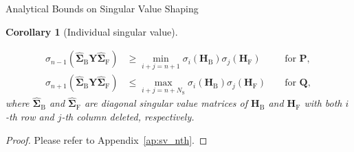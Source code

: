 \documentclass[journal]{IEEEtran}
\newtheorem{corollary}{Corollary}[proposition]
\begin{document}
\begin{section}{Analytical Bounds on Singular Value Shaping}
\begin{corollary}[Individual singular value\label{co:sv_nth}]
\begin{itemize}
				\begin{subequations}
					\begin{alignat}{2}
						\sigma_{n{-}1}(\hat{\mathbf{\Sigma}}_{\mathrm{B}} \mathbf{Y} \hat{\mathbf{\Sigma}}_{\mathrm{F}}) & {\ge} \min_{i+j=n+1} \sigma_i(\mathbf{H}_\mathrm{B}) \sigma_j(\mathbf{H}_\mathrm{F}) && \text{ for } \mathbf{P}, \label{eq:sv_nth_max_condition} \\
						\sigma_{n{+}1}(\hat{\mathbf{\Sigma}}_{\mathrm{B}} \mathbf{Y} \hat{\mathbf{\Sigma}}_{\mathrm{F}}) & {\le} \max_{i+j=n+N_\mathrm{S}} \sigma_i(\mathbf{H}_\mathrm{B}) \sigma_j(\mathbf{H}_\mathrm{F}) && \text{ for } \mathbf{Q}, \label{eq:sv_nth_min_condition}
					\end{alignat}
				\end{subequations}
				where $\hat{\mathbf{\Sigma}}_{\mathrm{B}}$ and $\hat{\mathbf{\Sigma}}_{\mathrm{F}}$ are diagonal singular value matrices of $\mathbf{H}_\mathrm{B}$ and $\mathbf{H}_\mathrm{F}$ with both $i$-th row and $j$-th column deleted, respectively.
			\end{itemize}
		\end{corollary}

		\begin{proof}
			Please refer to Appendix~\ref{ap:sv_nth}.
		\end{proof}


\end{section}
\end{document}
